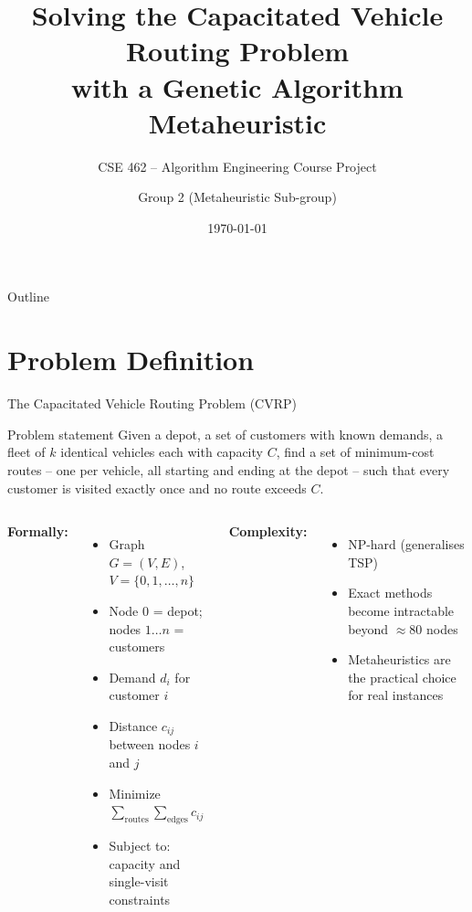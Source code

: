 \documentclass[aspectratio=169]{beamer}
\title[CVRP -- Genetic Algorithm]{%
  Solving the Capacitated Vehicle Routing Problem\\
  with a Genetic Algorithm Metaheuristic}
\subtitle{CSE 462 -- Algorithm Engineering Course Project}
\author{Group 2 (Metaheuristic Sub-group)}
\institute{Department of Computer Science and Engineering}
\date{\today}
\begin{document}
\begin{frame}
  \titlepage
\end{frame}

\begin{frame}{Outline}
  \tableofcontents
\end{frame}

\section{Problem Definition}

\begin{frame}{The Capacitated Vehicle Routing Problem (CVRP)}
  \begin{block}{Problem statement}
    Given a depot, a set of customers with known demands, a fleet of $k$
    identical vehicles each with capacity $C$, find a set of minimum-cost
    routes -- one per vehicle, all starting and ending at the depot -- such
    that every customer is visited exactly once and no route exceeds $C$.
  \end{block}

  \vspace{4pt}
  \begin{columns}
    \textbf{Formally:}
    \begin{itemize}
      \item Graph $G = (V, E)$,\; $V = \{0,1,\ldots,n\}$
      \item Node $0$ = depot;\; nodes $1\ldots n$ = customers
      \item Demand $d_i$ for customer $i$
      \item Distance $c_{ij}$ between nodes $i$ and $j$
      \item Minimize $\displaystyle\sum_{\text{routes}} \sum_{\text{edges}} c_{ij}$
      \item Subject to: capacity and single-visit constraints
    \end{itemize}

    \textbf{Complexity:}
    \begin{itemize}
      \item NP-hard (generalises TSP)
      \item Exact methods become intractable beyond $\approx$80 nodes
      \item Metaheuristics are the practical choice for real instances
    \end{itemize}
  \end{columns}
\end{frame}
\end{document}
